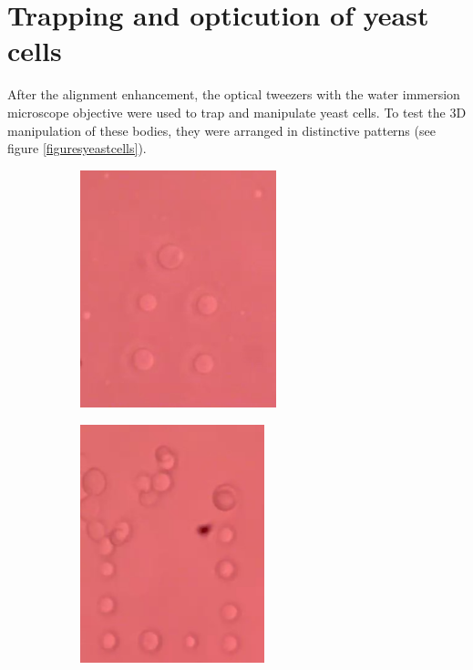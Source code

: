 \documentclass[letterpaper,12pt,oneside]{book}
\begin{document}
\section{Trapping and opticution of yeast cells}
After the alignment enhancement, the optical tweezers with the water immersion microscope objective were used to trap and manipulate yeast cells. To test the 3D manipulation of these bodies, they were arranged in distinctive patterns (see figure \ref{figuresyeastcells}). 
\begin{figure}[H] 
  \begin{subfigure}[b]{0.5\linewidth}
    \centering
    \includegraphics[width=0.75\linewidth,height=6.9cm]{particles2.png} 
    \caption{}    
    \label{fig7:a} 
    \vspace{4ex}
  \end{subfigure}%
  \begin{subfigure}[b]{0.5\linewidth}
    \centering
    \includegraphics[width=0.75\linewidth,height=6.9cm]{particles7.png} 
    \caption{}
    \label{fig7:b} 
    \vspace{4ex}
  \end{subfigure} 
  \begin{subfigure}[b]{0.5\linewidth}
    \centering

\end{subfigure}
\end{figure}
\end{document}
